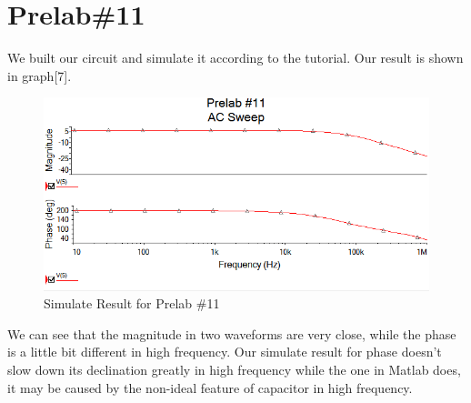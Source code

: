 \documentclass{IEEEtran}
\begin{document}
	\section{\textbf{Prelab\#11}}
	We built our circuit and simulate it according to the tutorial. Our result is shown in graph[7].\\
	\begin{figure}[!htbp]
		\centering
		\label{fig:1101}
		\begin{framed}
			\includegraphics[width=\linewidth]{images/11_1.PNG}
			\caption{Simulate Result for Prelab \#11}
		\end{framed}
	\end{figure}
	We can see that the magnitude in two waveforms are very close, while the phase is a little bit different in high frequency. Our simulate result for phase doesn't slow down its declination greatly in high frequency while the one in Matlab does, it may be caused by the non-ideal feature of capacitor in high frequency.\\
\end{document}
